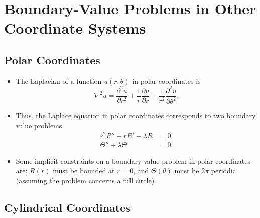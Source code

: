 \documentclass{article}
\begin{document}
\section{Boundary-Value Problems in Other Coordinate Systems}

\subsection{Polar Coordinates}

\begin{itemize}
  \item The Laplacian of a function $u(r, \theta)$ in polar coordinates is \[\nabla^2 u = \frac{\partial^2 u}{\partial r^2} + \frac{1}{r} \frac{\partial u}{\partial r} + \frac{1}{r^2} \frac{\partial^2 u}{\partial \theta^2}.\]

  \item Thus, the Laplace equation in polar coordinates corresponds to two boundary value problems \begin{align*}
          r^2 R'' + r R' - \lambda R & = 0  \\
          \Theta'' + \lambda \Theta  & = 0.
        \end{align*}

  \item Some implicit constraints on a boundary value problem in polar coordinates are: $R(r)$ must be bounded at $r = 0$, and $\Theta(\theta)$ must be $2 \pi$ periodic (assuming the problem concerns a full circle).
\end{itemize}

\subsection{Cylindrical Coordinates}
\end{document}
